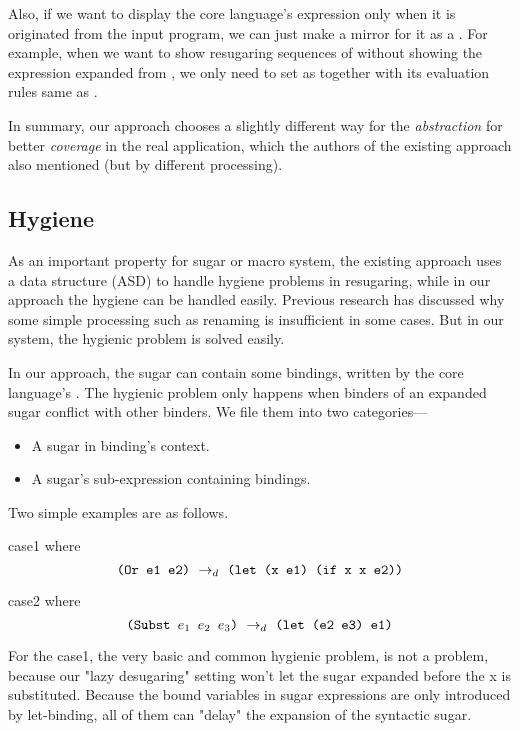 Also, if we want to display the core language's expression only when it is originated from the input program, we can just make a mirror for it as a . For example, when we want to show resugaring sequences of  
without showing the  expression expanded from , we only need to set  as  together with its evaluation rules same as .

In summary, our approach chooses a slightly different way for the \emph{abstraction} for better \emph{coverage} in the real application, which the authors of the existing approach also mentioned (but by different processing). 


\subsection{Hygiene}
\label{mark:hygiene}

As an important property for sugar or macro system, the existing approach uses a data structure (ASD) to handle hygiene problems in resugaring, while in our approach the hygiene can be handled easily. Previous research\cite{EssenceofHygiene} has discussed why some simple processing such as renaming is insufficient in some cases. But in our system, the hygienic problem is solved easily. 

In our approach, the sugar can contain some bindings, written by the core language's . The hygienic problem only happens when binders of an expanded sugar conflict with other binders. We file them into two categories---
\begin{itemize}
\item A sugar in binding's context.
\item A sugar's sub-expression containing bindings.
\end{itemize}
Two simple examples are as follows.

\begin{center}
	\hfill case1 {\scriptsize{where \[\texttt{(Or~e1~e2)} ~\rightarrow_d~ \texttt{(let (x e1) (if x x e2))}\]}}

 \hfill case2{
\scriptsize{
where \[
\texttt{(Subst $e_1$ $e_2$ $e_3$)} ~\rightarrow_d~ \texttt{(let (e2 e3) e1)}
\]}}
\end{center}



For the case1, the very basic and common hygienic problem, is not a problem, because our "lazy desugaring" setting won't let the sugar  expanded before the x is substituted. Because the bound variables in sugar expressions are only introduced by let-binding, all of them can "delay" the expansion of the syntactic sugar.


